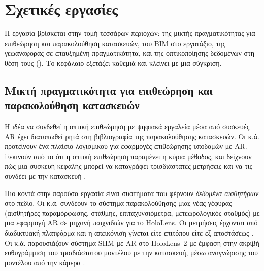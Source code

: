 \chapter{Σχετικές εργασίες}
\label{ch:related}


Η εργασία βρίσκεται στην τομή τεσσάρων περιοχών: της μικτής πραγματικότητας για επιθεώρηση και παρακολούθηση κατασκευών, του BIM στο εργοτάξιο, της γεωαναφοράς σε επαυξημένη πραγματικότητα, και της οπτικοποίησης δεδομένων στη θέση τους (). Το κεφάλαιο εξετάζει καθεμιά και κλείνει με μια σύγκριση.

\section{Μικτή πραγματικότητα για επιθεώρηση και παρακολούθηση κατασκευών}
\label{sec:rw-shm}

Η ιδέα να συνδεθεί η οπτική επιθεώρηση με ψηφιακά εργαλεία μέσα από συσκευές AR έχει διατυπωθεί ρητά στη βιβλιογραφία της παρακολούθησης κατασκευών. Οι  κ.ά. προτείνουν ένα πλαίσιο λογισμικού για εφαρμογές επιθεώρησης υποδομών με AR. Ξεκινούν από το ότι η οπτική επιθεώρηση παραμένει η κύρια μέθοδος, και δείχνουν πώς μια συσκευή κεφαλής μπορεί να καταγράφει τρισδιάστατες μετρήσεις και να τις συνδέει με την κατασκευή \cite{mascarenas2021ar}.

Πιο κοντά στην παρούσα εργασία είναι συστήματα που φέρνουν \emph{δεδομένα αισθητήρων} στο πεδίο. Οι  κ.ά. συνδέουν το σύστημα παρακολούθησης μιας νέας γέφυρας (αισθητήρες παραμόρφωσης, στάθμης, επιταχυνσιόμετρα, μετεωρολογικός σταθμός) με μια εφαρμογή AR σε μηχανή παιχνιδιών για το HoloLens. Οι μετρήσεις έρχονται από διαδικτυακή πλατφόρμα και η απεικόνιση γίνεται είτε επιτόπου είτε εξ αποστάσεως \cite{fawad2024bridge}. Οι  κ.ά. παρουσιάζουν σύστημα SHM με AR στο HoloLens~2 με έμφαση στην ακριβή ευθυγράμμιση του τρισδιάστατου μοντέλου με την κατασκευή, μέσω αναγνώρισης του μοντέλου από την κάμερα \cite{awadallah2025ar}.

